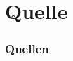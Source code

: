 \section{Quelle}

\frame
{
  \frametitle{Quellen}

\tiny\begin{thebibliography}{5}



\end{thebibliography}
}